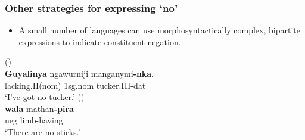 \documentclass{article}
\begin{document}
\subsubsection{Other strategies for expressing `no'}

\begin{itemize}
\item A small number of languages can use morphosyntactically complex, bipartite expressions to indicate constituent negation.
\end{itemize}

\begin{exe}
   (\citealt[204]{nordlinger98})\\
  \gll \textbf{Guyalinya}  ngawurniji manganymi\textbf{-nka}.\\
  lacking.II({\sc nom}) 1{\sc sg.nom}  tucker.III-{\sc dat}\\
  \glt `I've got no tucker.'
   (\citealt[74]{oates88}) \\
  \gll \textbf{wala} mathan\textbf{-pira}\\
  {\sc neg} limb-having.\\
  \glt `There are no sticks.'%
\end{exe}
\end{document}
